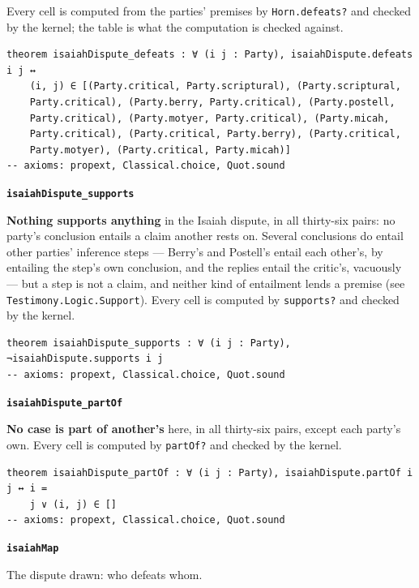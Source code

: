 \documentclass[11pt]{article}
\begin{document}
Every cell is computed from the parties’ premises by \texttt{Horn.defeats?} and checked by the kernel; the table is what the computation is checked against.

{\small\begin{verbatim}
theorem isaiahDispute_defeats : ∀ (i j : Party), isaiahDispute.defeats i j ↔
    (i, j) ∈ [(Party.critical, Party.scriptural), (Party.scriptural,
    Party.critical), (Party.berry, Party.critical), (Party.postell,
    Party.critical), (Party.motyer, Party.critical), (Party.micah,
    Party.critical), (Party.critical, Party.berry), (Party.critical,
    Party.motyer), (Party.critical, Party.micah)]
-- axioms: propext, Classical.choice, Quot.sound
\end{verbatim}}
\par\medskip\noindent\textbf{\texttt{isaiah\allowbreak{}Dispute\_\allowbreak{}supports}}\par\nobreak\noindent
\textbf{Nothing supports anything} in the Isaiah dispute, in all thirty-six pairs: no party’s conclusion entails a claim another rests on. Several conclusions do entail other parties’ inference steps — Berry’s and Postell’s entail each other’s, by entailing the step’s own conclusion, and the replies entail the critic’s, vacuously — but a step is not a claim, and neither kind of entailment lends a premise (see \texttt{Testimony.Logic.Support}). Every cell is computed by \texttt{supports?} and checked by the kernel.

{\small\begin{verbatim}
theorem isaiahDispute_supports : ∀ (i j : Party), ¬isaiahDispute.supports i j
-- axioms: propext, Classical.choice, Quot.sound
\end{verbatim}}
\par\medskip\noindent\textbf{\texttt{isaiah\allowbreak{}Dispute\_\allowbreak{}part\allowbreak{}Of}}\par\nobreak\noindent
\textbf{No case is part of another’s} here, in all thirty-six pairs, except each party’s own. Every cell is computed by \texttt{part\allowbreak{}Of?} and checked by the kernel.

{\small\begin{verbatim}
theorem isaiahDispute_partOf : ∀ (i j : Party), isaiahDispute.partOf i j ↔ i =
    j ∨ (i, j) ∈ []
-- axioms: propext, Classical.choice, Quot.sound
\end{verbatim}}
\par\medskip\noindent\textbf{\texttt{isaiah\allowbreak{}Map}}\par\nobreak\noindent
The dispute drawn: who defeats whom.
\end{document}
